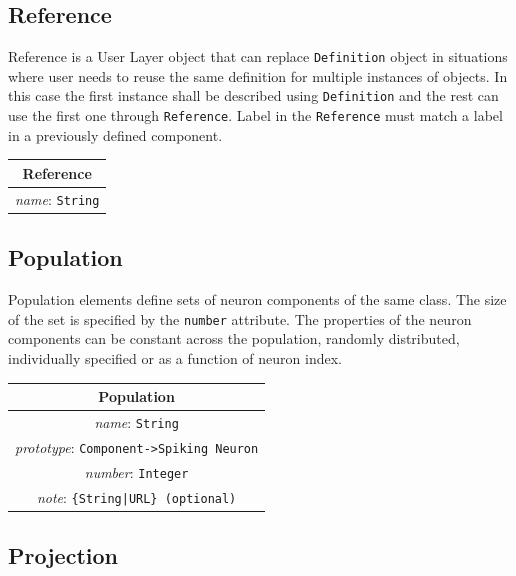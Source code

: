 \documentclass[draftspec]{ninemlspec}
\begin{document}
\subsection{Reference}

Reference is a User Layer object that can replace {\tt Definition} object
in situations where user needs to reuse the same definition for multiple
instances of objects. In this case the first instance shall be described using
{\tt Definition} and the rest can use the first one through {\tt Reference}.
Label in the {\tt Reference} must match a label in a previously defined
component.

\begin{table}[htb]
\center
\begin{tabular}{|c|}
\hline
\hline
Reference \\
\hline
\hline
{\em name}: {\tt String} \\
\hline
\end{tabular}
\end{table}

\subsection{Population}

Population elements define sets of neuron components of the same class. The size of the set is specified by the {\tt number} attribute. The properties of the neuron components can be constant across the population, randomly distributed, individually specified or as a function of neuron index.  

\begin{table}[htb]
\center
\begin{tabular}{|c|}
\hline
\hline
Population \\
\hline
\hline
{\em name}: {\tt String} \\
\hline
{\em prototype}: {\tt Component->Spiking Neuron} \\
\hline
{\em number}: {\tt Integer}\\
\hline
{\em note}: {\tt \{String|URL\} (optional)} \\
\hline
\end{tabular}
\end{table}

\newpage

\subsection{Projection}
\label{projections}
\end{document}
